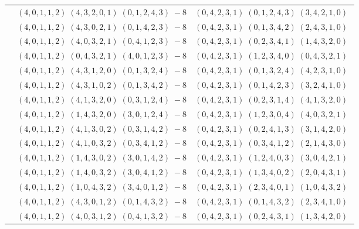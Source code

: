 \documentclass[11pt]{article}
\begin{document}
\begin{longtable}[l]{|c|c|c|}
 \cline{2-3} 
 & $(4 ,0 ,1 ,1 ,2) \;(4 ,3 ,2 ,0 ,1) \;(0 ,1 ,2 ,4 ,3) \;-8$ & $(0 ,4 ,2 ,3 ,1) \;(0 ,1 ,2 ,4 ,3) \;(3 ,4 ,2 ,1 ,0) \;$\\ 
 \cline{2-3} 
 & $(4 ,0 ,1 ,1 ,2) \;(4 ,3 ,0 ,2 ,1) \;(0 ,1 ,4 ,2 ,3) \;-8$ & $(0 ,4 ,2 ,3 ,1) \;(0 ,1 ,3 ,4 ,2) \;(2 ,4 ,3 ,1 ,0) \;$\\ 
 \cline{2-3} 
 & $(4 ,0 ,1 ,1 ,2) \;(4 ,0 ,3 ,2 ,1) \;(0 ,4 ,1 ,2 ,3) \;-8$ & $(0 ,4 ,2 ,3 ,1) \;(0 ,2 ,3 ,4 ,1) \;(1 ,4 ,3 ,2 ,0) \;$\\ 
 \cline{2-3} 
 & $(4 ,0 ,1 ,1 ,2) \;(0 ,4 ,3 ,2 ,1) \;(4 ,0 ,1 ,2 ,3) \;-8$ & $(0 ,4 ,2 ,3 ,1) \;(1 ,2 ,3 ,4 ,0) \;(0 ,4 ,3 ,2 ,1) \;$\\ 
 \cline{2-3} 
 & $(4 ,0 ,1 ,1 ,2) \;(4 ,3 ,1 ,2 ,0) \;(0 ,1 ,3 ,2 ,4) \;-8$ & $(0 ,4 ,2 ,3 ,1) \;(0 ,1 ,3 ,2 ,4) \;(4 ,2 ,3 ,1 ,0) \;$\\ 
 \cline{2-3} 
 & $(4 ,0 ,1 ,1 ,2) \;(4 ,3 ,1 ,0 ,2) \;(0 ,1 ,3 ,4 ,2) \;-8$ & $(0 ,4 ,2 ,3 ,1) \;(0 ,1 ,4 ,2 ,3) \;(3 ,2 ,4 ,1 ,0) \;$\\ 
 \cline{2-3} 
 & $(4 ,0 ,1 ,1 ,2) \;(4 ,1 ,3 ,2 ,0) \;(0 ,3 ,1 ,2 ,4) \;-8$ & $(0 ,4 ,2 ,3 ,1) \;(0 ,2 ,3 ,1 ,4) \;(4 ,1 ,3 ,2 ,0) \;$\\ 
 \cline{2-3} 
 & $(4 ,0 ,1 ,1 ,2) \;(1 ,4 ,3 ,2 ,0) \;(3 ,0 ,1 ,2 ,4) \;-8$ & $(0 ,4 ,2 ,3 ,1) \;(1 ,2 ,3 ,0 ,4) \;(4 ,0 ,3 ,2 ,1) \;$\\ 
 \cline{2-3} 
 & $(4 ,0 ,1 ,1 ,2) \;(4 ,1 ,3 ,0 ,2) \;(0 ,3 ,1 ,4 ,2) \;-8$ & $(0 ,4 ,2 ,3 ,1) \;(0 ,2 ,4 ,1 ,3) \;(3 ,1 ,4 ,2 ,0) \;$\\ 
 \cline{2-3} 
 & $(4 ,0 ,1 ,1 ,2) \;(4 ,1 ,0 ,3 ,2) \;(0 ,3 ,4 ,1 ,2) \;-8$ & $(0 ,4 ,2 ,3 ,1) \;(0 ,3 ,4 ,1 ,2) \;(2 ,1 ,4 ,3 ,0) \;$\\ 
 \cline{2-3} 
 & $(4 ,0 ,1 ,1 ,2) \;(1 ,4 ,3 ,0 ,2) \;(3 ,0 ,1 ,4 ,2) \;-8$ & $(0 ,4 ,2 ,3 ,1) \;(1 ,2 ,4 ,0 ,3) \;(3 ,0 ,4 ,2 ,1) \;$\\ 
 \cline{2-3} 
 & $(4 ,0 ,1 ,1 ,2) \;(1 ,4 ,0 ,3 ,2) \;(3 ,0 ,4 ,1 ,2) \;-8$ & $(0 ,4 ,2 ,3 ,1) \;(1 ,3 ,4 ,0 ,2) \;(2 ,0 ,4 ,3 ,1) \;$\\ 
 \cline{2-3} 
 & $(4 ,0 ,1 ,1 ,2) \;(1 ,0 ,4 ,3 ,2) \;(3 ,4 ,0 ,1 ,2) \;-8$ & $(0 ,4 ,2 ,3 ,1) \;(2 ,3 ,4 ,0 ,1) \;(1 ,0 ,4 ,3 ,2) \;$\\ 
 \cline{2-3} 
 & $(4 ,0 ,1 ,1 ,2) \;(4 ,3 ,0 ,1 ,2) \;(0 ,1 ,4 ,3 ,2) \;-8$ & $(0 ,4 ,2 ,3 ,1) \;(0 ,1 ,4 ,3 ,2) \;(2 ,3 ,4 ,1 ,0) \;$\\ 
 \cline{2-3} 
 & $(4 ,0 ,1 ,1 ,2) \;(4 ,0 ,3 ,1 ,2) \;(0 ,4 ,1 ,3 ,2) \;-8$ & $(0 ,4 ,2 ,3 ,1) \;(0 ,2 ,4 ,3 ,1) \;(1 ,3 ,4 ,2 ,0) \;$\\ 

\end{longtable}
\end{document}
